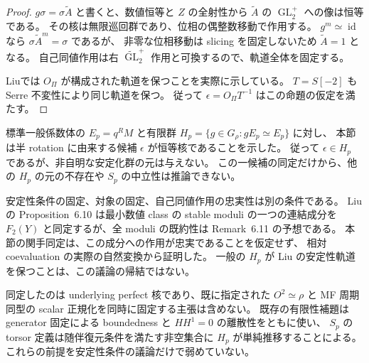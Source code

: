 \begin{proof}
$g\sigma=\sigma\widetilde A$ と書くと、数値恒等と $Z$ の全射性から
$\widetilde A$ の $\operatorname{GL}_2^+$ への像は恒等である。
その核は無限巡回群であり、位相の偶整数移動で作用する。
$g^m\simeq\operatorname{id}$ なら $\sigma\widetilde A^m=\sigma$ であるが、
非零な位相移動は slicing を固定しないため $\widetilde A=1$ となる。
自己同値作用は右 $\widetilde{\operatorname{GL}}_2^+$ 作用と可換するので、軌道全体を固定する。

Liu\cite[Theorem~5.5 の証明, Corollary~5.10]{NFMPeizeLiuFivefold}では
$O_\Pi$ が構成された軌道を保つことを実際に示している。
$T=S[-2]$ も Serre 不変性により同じ軌道を保つ。
従って $\epsilon=O_\Pi T^{-1}$ はこの命題の仮定を満たす。
\end{proof}

\begin{remark}[有限安定化群との関係]
標準一般係数体の $E_p=q^RM$ と有限群
$H_p=\{g\in G_\rho:gE_p\simeq E_p\}$ に対し、
本節は半 rotation に由来する候補 $\epsilon$ が恒等核であることを示した。
従って $\epsilon\in H_p$ であるが、非自明な安定化群の元は与えない。
この一候補の同定だけから、他の $H_p$ の元の不存在や $S_p$ の中立性は推論できない。

安定性条件の固定、対象の固定、自己同値作用の忠実性は別の条件である。
Liu の Proposition~6.10 は最小数値 class の stable moduli の一つの連結成分を
$F_2(Y)$ と同定するが、全 moduli の既約性は Remark~6.11 の予想である。
本節の関手同定は、この成分への作用が忠実であることを仮定せず、
相対 coevaluation の実際の自然変換から証明した。
一般の $H_p$ が Liu の安定性軌道を保つことは、この議論の帰結ではない。

同定したのは underlying perfect 核であり、既に指定された $O^2\simeq\rho$ と
MF 周期同型の scalar 正規化を同時に固定する主張は含めない。
既存の有限性補題は generator 固定による boundedness と $HH^1=0$ の離散性をともに使い、
$S_p$ の torsor 定義は随伴復元条件を満たす非空集合に $H_p$ が単純推移することによる。
これらの前提を安定性条件の議論だけで弱めていない。
\end{remark}

